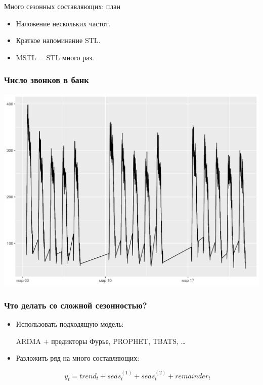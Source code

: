 
\begin{frame} %


\end{frame}



\begin{frame}{Много сезонных составляющих: план}
  \begin{itemize}[<+->]
    \item Наложение \alert{нескольких частот}.
    \item Краткое напоминание STL.
    \item MSTL = STL \alert{много раз}.
  \end{itemize}

\end{frame}

\begin{frame}
  \frametitle{Число звонков в банк}

  \includegraphics[width=\textwidth]{pictures/om_ts_09-006.png}

  
\end{frame}

\begin{frame}
  \frametitle{Что делать со сложной сезонностью?}

  \begin{itemize}[<+->]
    \item Использовать \alert{подходящую} модель:
    
    ARIMA + предикторы Фурье, PROPHET, TBATS, \ldots

    \item Разложить ряд на \alert{много} составляющих:
    
    \[
      y_t = trend_t + seas_t^{(1)} + seas_t^{(2)} + remainder_t
    \]
  \end{itemize}
  

\end{frame}


